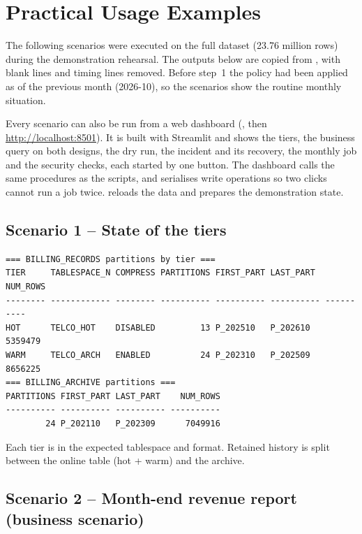 \chapter{Practical Usage Examples}\label{ch:usage}

The following scenarios were executed on the full dataset (23.76 million rows) during the
demonstration rehearsal. The outputs below are copied from , with blank
lines and timing lines removed. Before step~1 the policy had been applied as of the previous
month (2026-10), so the scenarios show the routine monthly situation.

Every scenario can also be run from a web dashboard (, then
\url{http://localhost:8501}). It is built with Streamlit and shows the tiers, the business query
on both designs, the dry run, the incident and its recovery, the monthly job and the security
checks, each started by one button. The dashboard calls the same  procedures as
the scripts, and serialises write operations so two clicks cannot run a job twice.
 reloads the data and prepares the demonstration state.

\section{Scenario 1 -- State of the tiers}

\needspace{0.3\textheight}
\begin{lstlisting}[style=console, caption={\code{scripts/06\_demo.sh 1} (excerpt)}]
=== BILLING_RECORDS partitions by tier ===
TIER     TABLESPACE_N COMPRESS PARTITIONS FIRST_PART LAST_PART    NUM_ROWS
-------- ------------ -------- ---------- ---------- ---------- ----------
HOT      TELCO_HOT    DISABLED         13 P_202510   P_202610      5359479
WARM     TELCO_ARCH   ENABLED          24 P_202310   P_202509      8656225
=== BILLING_ARCHIVE partitions ===
PARTITIONS FIRST_PART LAST_PART    NUM_ROWS
---------- ---------- ---------- ----------
        24 P_202110   P_202309      7049916
\end{lstlisting}

Each tier is in the expected tablespace and format. Retained history is split between the
online table (hot + warm) and the archive.

\section{Scenario 2 -- Month-end revenue report (business scenario)}

